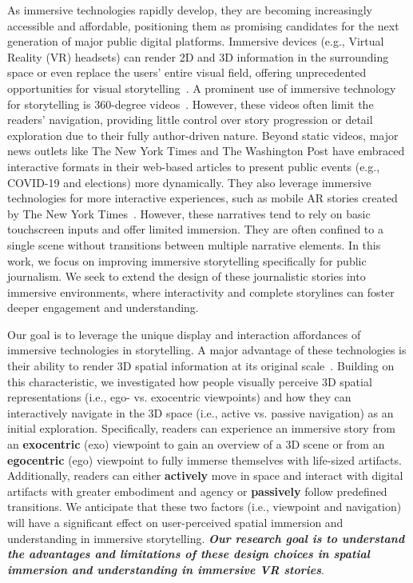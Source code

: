 As immersive technologies rapidly develop, they are becoming increasingly accessible and affordable, positioning them as promising candidates for the next generation of major public digital platforms. Immersive devices (e.g., Virtual Reality (VR) headsets) can render 2D and 3D information in the surrounding space or even replace the users' entire visual field, offering unprecedented opportunities for visual storytelling~\cite{kraus2021value, isenberg2018immersive}.
A prominent use of immersive technology for storytelling is 360-degree videos~\cite{google_2016_beyond, sportsillustrated_2017_chapter}. However, these videos often limit the readers' navigation, providing little control over story progression or detail exploration due to their fully author-driven nature.
Beyond static videos, major news outlets like The New York Times and The Washington Post have embraced interactive formats in their web-based articles to present public events (e.g., COVID-19 and elections) more dynamically.
They also leverage immersive technologies for more interactive experiences, such as 
mobile AR stories created by The New York Times~\cite{thenewyorktimes_2022_showcasing}. 
However, these narratives tend to rely on basic touchscreen inputs and offer limited immersion. They are often confined to a single scene without transitions between multiple narrative elements.
In this work, we focus on improving immersive storytelling specifically for public journalism.
We seek to extend the design of these journalistic stories into immersive environments, where interactivity and complete storylines can foster deeper engagement and understanding.

Our goal is to leverage the unique display and interaction affordances of immersive technologies in storytelling. 
A major advantage of these technologies is their ability to render 3D spatial information at its original scale~\cite{isenberg2018immersive}. 
Building on this characteristic, we investigated how people visually perceive 3D spatial representations (i.e., ego- vs. exocentric viewpoints) and how they can interactively navigate in the 3D space (i.e., active vs. passive navigation) as an initial exploration. Specifically, readers can experience an immersive story from an \textbf{exocentric} (exo) viewpoint to gain an overview of a 3D scene or from an \textbf{egocentric} (ego) viewpoint to fully immerse themselves with life-sized artifacts. Additionally, readers can either \textbf{actively} move in space and interact with digital artifacts with greater embodiment and agency or \textbf{passively} follow predefined transitions.
We anticipate that these two factors (i.e., viewpoint and navigation) will have a significant effect on user-perceived spatial immersion and understanding in immersive storytelling. 
\textbf{\textit{Our research goal is to understand the advantages and limitations of these design choices in spatial immersion and understanding in immersive VR stories}}.


